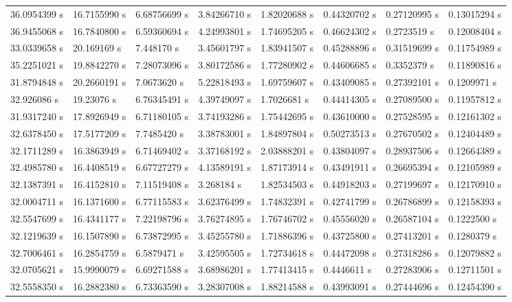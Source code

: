 \begin{landscape}
\begin{longtable}{llllllll}
    36.0954399 s& 16.7155990 s& 6.68756699 s& 3.84266710 s& 1.82020688 s& 0.44320702 s& 0.27120995 s& 0.13015294 s\\
    36.9455068 s& 16.7840800 s& 6.59360694 s& 4.24993801 s& 1.74695205 s& 0.46624302 s& 0.2723519 s & 0.12008404 s\\
    33.0339658 s& 20.169169 s & 7.448170 s  & 3.45601797 s& 1.83941507 s& 0.45288896 s& 0.31519699 s& 0.11754989 s\\
    35.2251021 s& 19.8842270 s& 7.28073096 s& 3.80172586 s& 1.77280902 s& 0.44606685 s& 0.3352379 s & 0.11890816 s\\
    31.8794848 s& 20.2660191 s& 7.0673620 s & 5.22818493 s& 1.69759607 s& 0.43409085 s& 0.27392101 s& 0.1209971 s \\
    32.926086 s & 19.23076 s  & 6.76345491 s& 4.39749097 s& 1.7026681 s & 0.44414305 s& 0.27089500 s& 0.11957812 s\\
    31.9317240 s& 17.8926949 s& 6.71180105 s& 3.74193286 s& 1.75442695 s& 0.43610000 s& 0.27528595 s& 0.12161302 s\\
    32.6378450 s& 17.5177209 s& 7.7485420 s & 3.38783001 s& 1.84897804 s& 0.50273513 s& 0.27670502 s& 0.12404489 s\\
    32.1711289 s& 16.3863949 s& 6.71469402 s& 3.37168192 s& 2.03888201 s& 0.43804097 s& 0.28937506 s& 0.12664389 s\\
    32.4985780 s& 16.4408519 s& 6.67727279 s& 4.13589191 s& 1.87173914 s& 0.43491911 s& 0.26695394 s& 0.12105989 s\\
    32.1387391 s& 16.4152810 s& 7.11519408 s& 3.268184 s  & 1.82534503 s& 0.44918203 s& 0.27199697 s& 0.12170910 s\\
    32.0004711 s& 16.1371600 s& 6.77115583 s& 3.62376499 s& 1.74832391 s& 0.42741799 s& 0.26786899 s& 0.12158393 s\\
    32.5547699 s& 16.4341177 s& 7.22198796 s& 3.76274895 s& 1.76746702 s& 0.45556020 s& 0.26587104 s& 0.1222500 s \\
    32.1219639 s& 16.1507890 s& 6.73872995 s& 3.45255780 s& 1.71886396 s& 0.43725800 s& 0.27413201 s& 0.1280379 s \\
    32.7006461 s& 16.2854759 s& 6.5879471 s & 3.42595505 s& 1.72734618 s& 0.44472098 s& 0.27318286 s& 0.12079882 s\\
    32.0705621 s& 15.9990079 s& 6.69271588 s& 3.68986201 s& 1.77413415 s& 0.4446611 s & 0.27283906 s& 0.12711501 s\\
    32.5558350 s& 16.2882380 s& 6.73363590 s& 3.28307008 s& 1.88214588 s& 0.43993091 s& 0.27444696 s& 0.12454390 s\\

\end{longtable}
\end{landscape}
